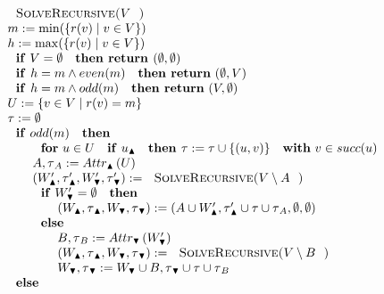 \begin{equation*}
\begin{array}{l}
\text{\textsc{SolveRecursive(}}V\text{\textsc{)}} \\ 
m:=\min (\{r(v)\mid v\in V\}) \\ 
h:=\max (\{r(v)\mid v\in V\}) \\ 
\text{\textbf{if} }V=\emptyset \text{ \textbf{then return }}(\emptyset
,\emptyset ) \\ 
\text{\textbf{if }}h=m\wedge even(m)\text{ \textbf{then return} }(\emptyset
,V) \\ 
\text{\textbf{if }}h=m\wedge odd(m)\text{ \textbf{then return} }(V,\emptyset
) \\ 
U:=\{v\in V\mid r(v)=m\} \\ 
\tau :=\emptyset  \\ 
\text{\textbf{if} }odd(m)\text{ \textbf{then}} \\ 
\qquad \text{\textbf{for} }u\in U\text{ \textbf{if} }u_{\blacktriangle }%
\text{ \textbf{then }}\tau :=\tau \cup \{(u,v)\}\text{ \textbf{with} }v\in
succ(u) \\ 
\qquad A,\tau _{A}:=Attr_{\blacktriangle }\left( U\right)  \\ 
\qquad \left( W_{\blacktriangle }^{\prime },\tau _{\blacktriangle }^{\prime
},W_{\blacktriangledown }^{\prime },\tau _{\blacktriangledown }^{\prime
}\right) :=\text{\textsc{SolveRecursive(}}V\setminus A\text{)} \\ 
\qquad \text{\textbf{if} }W_{\blacktriangledown }^{\prime }=\emptyset \text{ 
\textbf{then}} \\ 
\qquad \qquad \left( W_{\blacktriangle },\tau _{\blacktriangle
},W_{\blacktriangledown },\tau _{\blacktriangledown }\right) :=\left( A\cup
W_{\blacktriangle }^{\prime },\tau _{\blacktriangle }^{\prime }\cup \tau
\cup \tau _{A},\emptyset ,\emptyset \right)  \\ 
\qquad \text{\textbf{else}} \\ 
\qquad \qquad B,\tau _{B}:=Attr_{\blacktriangledown }\left(
W_{\blacktriangledown }^{\prime }\right)  \\ 
\qquad \qquad \left( W_{\blacktriangle },\tau _{\blacktriangle
},W_{\blacktriangledown },\tau _{\blacktriangledown }\right) :=\text{\textsc{%
SolveRecursive(}}V\setminus B\text{)} \\ 
\qquad \qquad W_{\blacktriangledown },\tau _{\blacktriangledown
}:=W_{\blacktriangledown }\cup B,\tau _{\blacktriangledown }\cup \tau \cup
\tau _{B} \\ 
\text{\textbf{else}} \\ 

\end{array}
\end{equation*}
